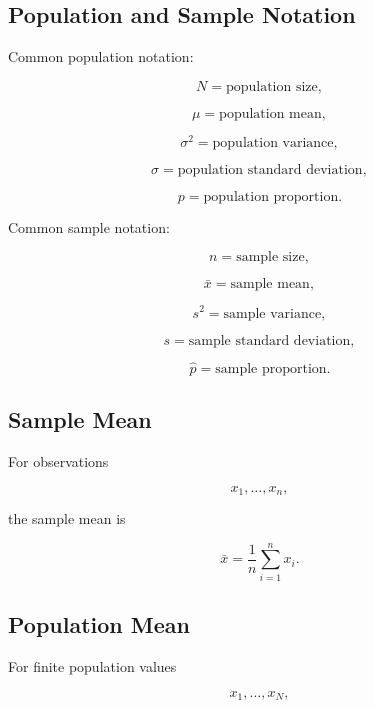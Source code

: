 \subsection{Population and Sample Notation}
\label{subsec:population-sample-notation}

Common population notation:

\[
\boxed{
N
=
\text{population size},
}
\]

\[
\boxed{
\mu
=
\text{population mean},
}
\]

\[
\boxed{
\sigma^2
=
\text{population variance},
}
\]

\[
\boxed{
\sigma
=
\text{population standard deviation},
}
\]

\[
\boxed{
p
=
\text{population proportion}.
}
\]

Common sample notation:

\[
\boxed{
n
=
\text{sample size},
}
\]

\[
\boxed{
\bar{x}
=
\text{sample mean},
}
\]

\[
\boxed{
s^2
=
\text{sample variance},
}
\]

\[
\boxed{
s
=
\text{sample standard deviation},
}
\]

\[
\boxed{
\hat p
=
\text{sample proportion}.
}
\]

\subsection{Sample Mean}
\label{subsec:sample-mean-reference}

For observations

\[
x_1,\ldots,x_n,
\]

the sample mean is

\[
\boxed{
\bar{x}
=
\frac1n
\sum_{i=1}^{n}x_i.
}
\]

\subsection{Population Mean}
\label{subsec:population-mean-reference}

For finite population values

\[
x_1,\ldots,x_N,
\]

